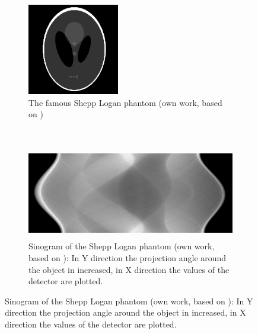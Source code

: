 \begin{figure}[h]
	\centering
	\begin{subfigure}[b]{0.28\textwidth}
		\centering
		\includegraphics[height=4cm]{images/shepp_logan.png}
		\caption{The famous Shepp Logan phantom (own work, based on \cite{shepploganphantom})}
		\label{shepplogan}
	\end{subfigure}%
	~
	\begin{subfigure}[b]{0.68\textwidth}
		\centering
		\includegraphics[height=4cm]{images/shepp_logan_sino.png}
		\caption{Sinogram of the Shepp Logan phantom (own work, based on \cite{shepploganphantom}): In Y direction the projection angle around the object in increased, in X direction the values of the detector are plotted.}
		\label{shepplogansino}
	\end{subfigure}%
\end{figure}
